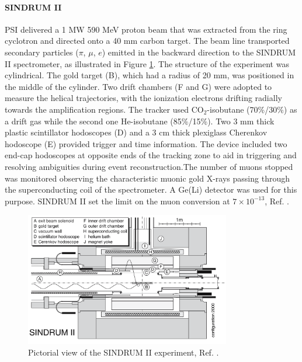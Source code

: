\paragraph{SINDRUM II}
PSI delivered a 1 MW 590 MeV proton beam that was extracted from the ring
cyclotron and directed onto a 40 mm carbon target. The beam line
transported secondary particles ($\pi$, $\mu$, $e$) emitted in the backward direction to the SINDRUM II spectrometer, as
illustrated in Figure \ref{fig:sindrumii}. The structure of the experiment
was cylindrical. The gold target (B), which had a radius of 20 mm, was positioned
in the middle of the cylinder. Two drift chambers (F and G) were adopted to measure
the helical trajectories, with the ionization electrons drifting radially towards the amplification 
regions. The tracker used CO$_2$-isobutane (70\%/30\%) as a drift
gas while the second one He-isobutane (85\%/15\%). Two 3 mm thick plastic scintillator hodoscopes (D) and a 3 cm 
thick plexiglass Cherenkov hodoscope (E) provided trigger and time information. 
The device included two end-cap hodoscopes at opposite ends of the tracking zone to aid in triggering 
and resolving ambiguities during event reconstruction.The number of muons stopped
was monitored observing the characteristic muonic gold X-rays passing through the
superconducting coil of the spectrometer. A Ge(Li) detector was used for this purpose.
SINDRUM II set the limit on the muon conversion at $7 \times 10^{-13}$, Ref. \cite{SINDRUMII:2006dvw}.
\begin{figure}[!h]
\centering
\includegraphics[width =0.8\textwidth]{figures/png/Screenshot_20240307_163120.png}
\caption{Pictorial view of the SINDRUM II experiment, Ref. \cite{SINDRUMII:2006dvw}.}
\label{fig:sindrumii}
\end{figure}
